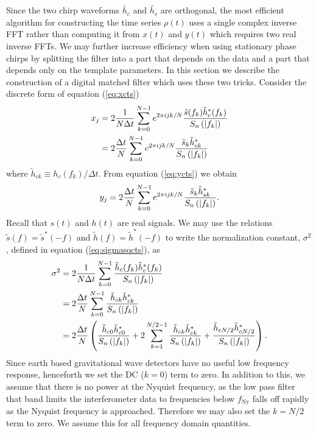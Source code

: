 Since the two chirp waveforms $\tilde{h_c}$ and $\tilde{h_s}$ are 
orthogonal, the most efficient algorithm for constructing the time series
$\rho(t)$ uses a single complex inverse FFT rather than computing it from
$x(t)$ and $y(t)$ which requires two real inverse FFTs. We may further
increase efficiency when using stationary phase chirps by splitting the filter
into a part that depends on the data and a part that depends only on the
template parameters. In this section we describe the construction of a digital
matched filter which uses these two tricks.  Consider the discrete form of
equation (\ref{eq:xcts})
\begin{equation}
\begin{split}
\label{eq:xdisc}
x_j &= 2 \frac{1}{N\Delta t} \sum_{k=0}^{N-1} e^{2\pi ijk/N} 
\frac{\tilde{s}(f_k) \tilde{h}_{c}^\ast(f_k)}{S_n\left(\left|f_{k}\right|\right)} \\
&=
2 \frac{\Delta t}{N} \sum_{k=0}^{N-1} e^{2\pi ijk/N} 
\frac{\tilde{s}_k \tilde{h}_{ck}^\ast} {S_n\left(\left|f_{k}\right|\right)}
\end{split}
\end{equation}
where  $\tilde{h}_{ck} \equiv {h}_c(f_k) / \Delta t$. From equation
(\ref{eq:ycts}) we obtain
\begin{equation}
\label{eq:ydisc}
y_j = 2 \frac{\Delta t}{N} \sum_{k=0}^{N-1} e^{2\pi ijk/N} 
\frac{\tilde{s}_k \tilde{h}_{sk}^\ast} {S_n\left(\left|f_{k}\right|\right)}.
\end{equation}
Recall that $s(t)$ and $h(t)$ are real signals. We may use the relations
$\tilde{s}(f) = \tilde{s}^\ast(-f)$ and $\tilde{h}(f) = \tilde{h}^\ast(-f)$ to
write the normalization constant, $\sigma^2$, defined in equation
(\ref{eq:sigmasqcts}), as
\begin{equation}
\begin{split}
\label{eq:sigmasqdisc}
\sigma^2 &= 2 \frac{1}{N\Delta t} \sum_{k=0}^{N-1}
\frac{\tilde{h}_{c}(f_k)\tilde{h}_{c}^\ast(f_k)}{S_n\left(\left|f_{k}\right|\right)}  \\
&=
2 \frac{\Delta t}{N} \sum_{k=0}^{N-1}
\frac{\tilde{h}_{ck}\tilde{h}_{ck}^\ast}{S_n\left(\left|f_{k}\right|\right)} \\
&=
2 \frac{\Delta t}{N} \left( 
\frac{\tilde{h}_{c0}\tilde{h}_{c0}^\ast}{S_n\left(\left|f_{k}\right|\right)} 
+
2 \sum_{k=1}^{N/2-1}
\frac{\tilde{h}_{ck}\tilde{h}_{ck}^\ast}{S_n\left(\left|f_{k}\right|\right)}
+
\frac{\tilde{h}_{cN/2}\tilde{h}_{cN/2}^\ast}{S_n\left(\left|f_{k}\right|\right)} 
\right).
\end{split}
\end{equation}
Since earth based gravitational wave detectors have no useful low frequency
response, henceforth we set the DC ($k=0$) term to zero. In addition to this, we
assume that there is no power at the Nyquist frequency, as the low pass filter
that band limits the interferometer data to frequencies below
$f_\mathrm{Ny}$ falls off rapidly as the Nyquist frequency is approached.
Therefore we may also set the $k=N/2$ term to zero. We assume this for all
frequency domain quantities.

